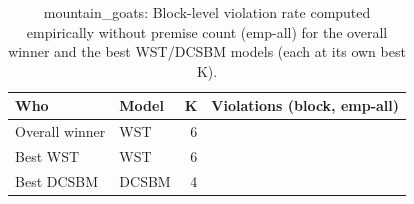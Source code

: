 \begin{table}[!h]
\centering
\caption{mountain_goats: Block-level violation rate computed empirically without premise count (emp-all) for the overall winner and the best WST/DCSBM models (each at its own best K).\\\label{tab:app-mountain_goats-best-block-empall}}
\centering
\begin{tabular}[t]{llrr}
\toprule
Who & Model & K & Violations (block, emp-all)\\
\midrule
Overall winner & WST & 6 & \\
Best WST & WST & 6 & \\
Best DCSBM & DCSBM & 4 & \\
\bottomrule
\end{tabular}
\end{table}
